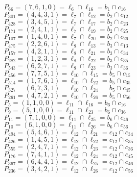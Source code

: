 \documentclass{article}
\begin{document}
{\begin{multicols}{2}
$P_{66} = ( 7, 6, 1, 0 ) = \ell_{6} \cap \ell_{16}  = b_{1} \cap c_{16}$\\
$P_{301} = ( 4, 4, 3, 1 ) = \ell_{7} \cap \ell_{12}  = b_{2} \cap c_{12}$\\
$P_{428} = ( 3, 4, 5, 1 ) = \ell_{7} \cap \ell_{17}  = b_{2} \cap c_{23}$\\
$P_{171} = ( 2, 4, 1, 1 ) = \ell_{7} \cap \ell_{19}  = b_{2} \cap c_{25}$\\
$P_{107} = ( 1, 4, 0, 1 ) = \ell_{7} \cap \ell_{20}  = b_{2} \cap c_{26}$\\
$P_{475} = ( 2, 2, 6, 1 ) = \ell_{8} \cap \ell_{13}  = b_{3} \cap c_{13}$\\
$P_{157} = ( 4, 2, 1, 1 ) = \ell_{8} \cap \ell_{21}  = b_{3} \cap c_{34}$\\
$P_{282} = ( 1, 2, 3, 1 ) = \ell_{8} \cap \ell_{22}  = b_{3} \cap c_{35}$\\
$P_{543} = ( 6, 2, 7, 1 ) = \ell_{8} \cap \ell_{23}  = b_{3} \cap c_{36}$\\
$P_{456} = ( 7, 7, 5, 1 ) = \ell_{10} \cap \ell_{15}  = b_{5} \cap c_{15}$\\
$P_{514} = ( 1, 7, 6, 1 ) = \ell_{10} \cap \ell_{22}  = b_{5} \cap c_{35}$\\
$P_{327} = ( 6, 7, 3, 1 ) = \ell_{10} \cap \ell_{24}  = b_{5} \cap c_{45}$\\
$P_{261} = ( 4, 7, 2, 1 ) = \ell_{10} \cap \ell_{26}  = b_{5} \cap c_{56}$\\
$P_{5} = ( 1, 1, 0, 0 ) = \ell_{11} \cap \ell_{16}  = b_{6} \cap c_{16}$\\
$P_{9} = ( 5, 1, 0, 0 ) = \ell_{11} \cap \ell_{23}  = b_{6} \cap c_{36}$\\
$P_{11} = ( 7, 1, 0, 0 ) = \ell_{11} \cap \ell_{25}  = b_{6} \cap c_{46}$\\
$P_{10} = ( 6, 1, 0, 0 ) = \ell_{11} \cap \ell_{26}  = b_{6} \cap c_{56}$\\
$P_{494} = ( 5, 4, 6, 1 ) = \ell_{12} \cap \ell_{21}  = c_{12} \cap c_{34}$\\
$P_{426} = ( 1, 4, 5, 1 ) = \ell_{12} \cap \ell_{22}  = c_{12} \cap c_{35}$\\
$P_{555} = ( 2, 4, 7, 1 ) = \ell_{12} \cap \ell_{23}  = c_{12} \cap c_{36}$\\
$P_{176} = ( 7, 4, 1, 1 ) = \ell_{12} \cap \ell_{24}  = c_{12} \cap c_{45}$\\
$P_{367} = ( 6, 4, 4, 1 ) = \ell_{12} \cap \ell_{25}  = c_{12} \cap c_{46}$\\
$P_{236} = ( 3, 4, 2, 1 ) = \ell_{12} \cap \ell_{26}  = c_{12} \cap c_{56}$\\

\end{multicols}}
\end{document}
